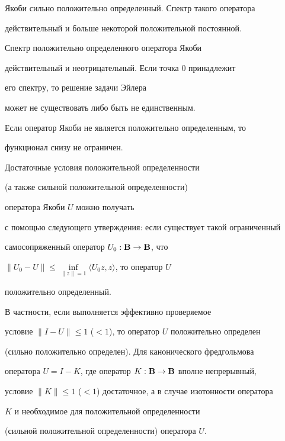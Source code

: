 Якоби сильно положительно определенный. Спектр такого оператора


действительный и больше некоторой положительной постоянной.





Спектр положительно определенного оператора Якоби


действительный и неотрицательный. Если точка $0$ принадлежит


его спектру, то решение задачи Эйлера


может не существовать либо быть не единственным.





Если оператор Якоби не является положительно определенным, то


функционал снизу не ограничен.





Достаточные условия положительной определенности


(а также сильной положительной определенности)


оператора Якоби $U$ можно получать


с помощью следующего утверждения: если существует такой ограниченный


самосопряженный оператор $U_0:\bold B{}\to\bold B{}$, что


$\|U_0-U\|\le\inf\limits_{\|z\|=1}\langle U_0z,z\rangle$, то оператор $U$


положительно определенный.


В частности, если выполняется эффективно проверяемое


условие $\|I- U\|\le1$ ($<1$), то оператор $U$ положительно определен


(сильно положительно определен). Для канонического фредгольмова


оператора $U=I-K$, где оператор $K:\bold B{}\to\bold B{}$ вполне непрерывный,


условие $\|K\|\le1$ ($<1$) достаточное, а в случае изотонности оператора


$K$ и необходимое для положительной определенности


(сильной положительной определенности) оператора $U$.





